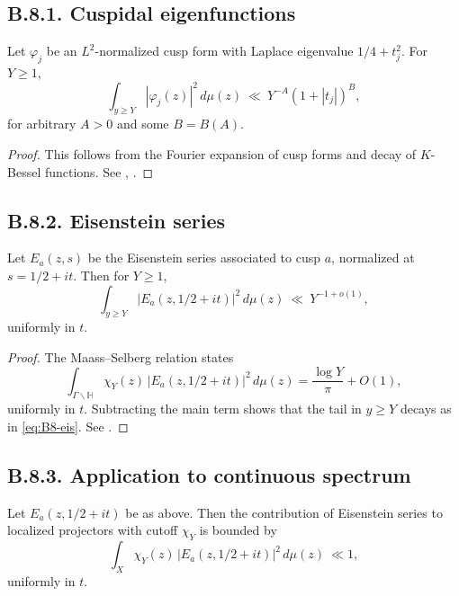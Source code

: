 \subsection*{B.8.1. Cuspidal eigenfunctions}

\begin{lemma}\label{lem:B8-form}
Let $\varphi_j$ be an $L^2$-normalized cusp form with Laplace eigenvalue $1/4+t_j^2$.
For $Y\ge 1$,
\begin{equation}\label{eq:B8-form}
\int_{y\ge Y} |\varphi_j(z)|^2\,d\mu(z)\ \ll\ Y^{-A}(1+|t_j|)^B,
\end{equation}
for arbitrary $A>0$ and some $B=B(A)$.
\end{lemma}

\begin{proof}
This follows from the Fourier expansion of cusp forms and decay of $K$-Bessel functions.
See \cite[Ch.~3]{IwaniecKowalski}, \cite{HejhalI}.
\end{proof}

\subsection*{B.8.2. Eisenstein series}

\begin{lemma}\label{lem:B8-eis}
Let $E_a(z,s)$ be the Eisenstein series associated to cusp $a$, normalized at $s=1/2+it$.
Then for $Y\ge 1$,
\begin{equation}\label{eq:B8-eis}
\int_{y\ge Y} |E_a(z,1/2+it)|^2\,d\mu(z)\ \ll\ Y^{-1+o(1)},
\end{equation}
uniformly in $t$.
\end{lemma}

\begin{proof}
The Maass--Selberg relation states
\[
\int_{\Gamma\backslash \mathbb{H}} \chi_Y(z)\,|E_a(z,1/2+it)|^2\,d\mu(z)
=\frac{\log Y}{\pi}+O(1),
\]
uniformly in $t$.
Subtracting the main term shows that the tail in $y\ge Y$ decays as in \eqref{eq:B8-eis}.
See \cite{HejhalII}.
\end{proof}

\subsection*{B.8.3. Application to continuous spectrum}

\begin{proposition}\label{prop:B8-cont}
Let $E_a(z,1/2+it)$ be as above.
Then the contribution of Eisenstein series to localized projectors with cutoff $\chi_Y$ is bounded by
\begin{equation}\label{eq:B8-cont}
\int_X \chi_Y(z)\,|E_a(z,1/2+it)|^2\,d\mu(z)\ \ll 1,
\end{equation}
uniformly in $t$.
\end{proposition}

